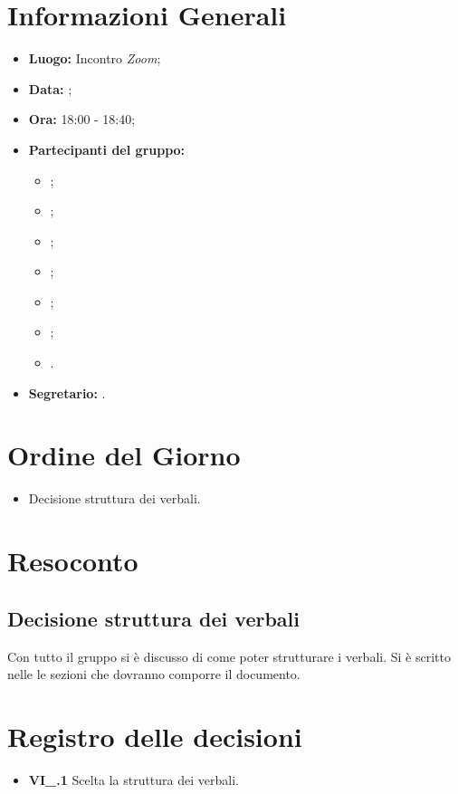 \section{Informazioni Generali}
\begin{itemize}
\item \textbf{Luogo:} Incontro \textit{Zoom};
\item \textbf{Data:} \Data;
\item \textbf{Ora:} 18:00 - 18:40;
\item \textbf{Partecipanti del gruppo:}
	\begin{itemize}
		\item \BL{}; 
		\item \FF{};
		\item \MM{}; 
		\item \PC{};
		\item \TG{};
		\item \TL{};
		\item \VD{}.
	\end{itemize} 
\item \textbf{Segretario:} \PC{}.
\end{itemize}

\section{Ordine del Giorno}
\begin{itemize}
 \item Decisione struttura dei verbali.
\end{itemize}

\section{Resoconto}
\subsection{Decisione struttura dei verbali}
Con tutto il gruppo si è discusso di come poter strutturare i verbali. Si è scritto nelle \textit{\NdP} le sezioni che dovranno comporre il documento.

\section{Registro delle decisioni}
\begin{itemize}
  \item \textbf{VI\_\Data.1} Scelta la struttura dei verbali.
\end{itemize}




